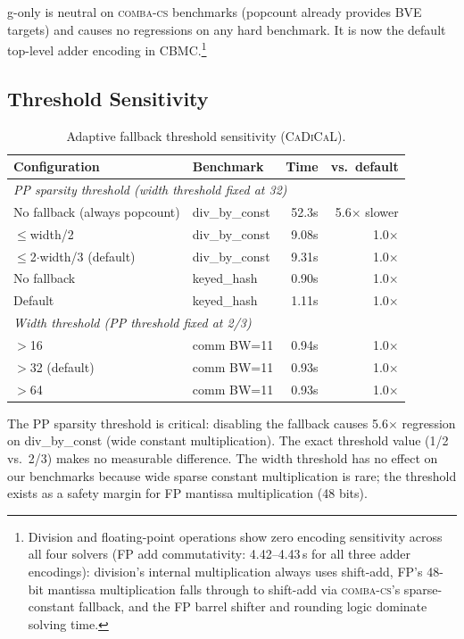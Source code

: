 \documentclass[a4paper]{ceurart}
\newcommand{\combacs}{\textsc{comba-cs}\xspace}
\newcommand{\cadical}{\textsc{CaDiCaL}\xspace}
\newcommand{\cbmc}{\textsc{CBMC}\xspace}
\begin{document}
g-only is neutral on \combacs benchmarks (popcount already provides
BVE targets) and causes no regressions on any hard benchmark. It is
now the default top-level adder encoding in \cbmc.\footnote{Division
and floating-point operations show zero encoding sensitivity across
all four solvers (FP add commutativity: 4.42--4.43\,s for all three
adder encodings): division's internal multiplication always uses
shift-add, FP's 48-bit mantissa multiplication falls through to
shift-add via \combacs's sparse-constant fallback, and the FP
barrel shifter and rounding logic dominate solving time.}


\subsection{Threshold Sensitivity}
\label{sec:thresholds}

\begin{table}[ht]
\caption{Adaptive fallback threshold sensitivity (\cadical).}
\label{tab:thresholds}
\centering
\begin{tabular}{llrr}
\toprule
Configuration & Benchmark & Time & vs.\ default \\
\midrule
\multicolumn{4}{l}{\emph{PP sparsity threshold (width threshold fixed at 32)}} \\
No fallback (always popcount) & div\_by\_const & 52.3s & 5.6$\times$ slower \\
$\leq$width/2 & div\_by\_const & 9.08s & 1.0$\times$ \\
$\leq$2$\cdot$width/3 (default) & div\_by\_const & 9.31s & 1.0$\times$ \\
No fallback & keyed\_hash & 0.90s & 1.0$\times$ \\
Default & keyed\_hash & 1.11s & 1.0$\times$ \\
\midrule
\multicolumn{4}{l}{\emph{Width threshold (PP threshold fixed at 2/3)}} \\
$>$16 & comm BW=11 & 0.94s & 1.0$\times$ \\
$>$32 (default) & comm BW=11 & 0.93s & 1.0$\times$ \\
$>$64 & comm BW=11 & 0.93s & 1.0$\times$ \\
\bottomrule
\end{tabular}
\end{table}

The PP sparsity threshold is critical: disabling the fallback causes
5.6$\times$ regression on div\_by\_const (wide constant multiplication).
The exact threshold value (1/2 vs.\ 2/3) makes no measurable
difference. The width threshold has no effect on our benchmarks because
wide sparse constant multiplication is rare; the threshold exists as a
safety margin for FP mantissa multiplication (48 bits).
\end{document}
